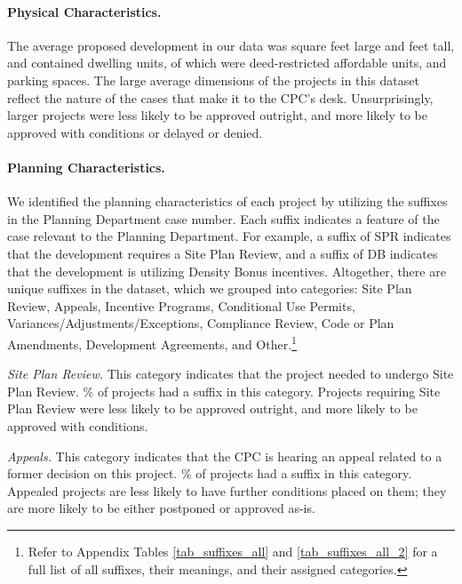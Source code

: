 \paragraph{Physical Characteristics.} The average proposed development in our data was  square feet large and  feet tall, and contained  dwelling units, of which  were deed-restricted affordable units, and  parking spaces. The large average dimensions of the projects in this dataset reflect the nature of the cases that make it to the CPC's desk. Unsurprisingly, larger projects were less likely to be approved outright, and more likely to be approved with conditions or delayed or denied. 

\paragraph{Planning Characteristics.} We identified the planning characteristics of each project by utilizing the suffixes in the Planning Department case number. Each suffix indicates a feature of the case relevant to the Planning Department. For example, a suffix of SPR indicates that the development requires a Site Plan Review, and a suffix of DB indicates that the development is utilizing Density Bonus incentives. Altogether, there are  unique suffixes in the dataset, which we grouped into  categories: Site Plan Review, Appeals, Incentive Programs, Conditional Use Permits, Variances/Adjustments/Exceptions, Compliance Review, Code or Plan Amendments, Development Agreements, and Other.\footnote{Refer to Appendix Tables \ref{tab_suffixes_all} and \ref{tab_suffixes_all_2} for a full list of all  suffixes, their meanings, and their assigned categories.}

\emph{Site Plan Review.} This category indicates that the project needed to undergo Site Plan Review. \% of projects had a suffix in this category. Projects requiring Site Plan Review were less likely to be approved outright, and more likely to be approved with conditions.

\emph{Appeals.} This category indicates that the CPC is hearing an appeal related to a former decision on this project. \% of projects had a suffix in this category. Appealed projects are less likely to have further conditions placed on them; they are more likely to be either postponed or approved as-is.

